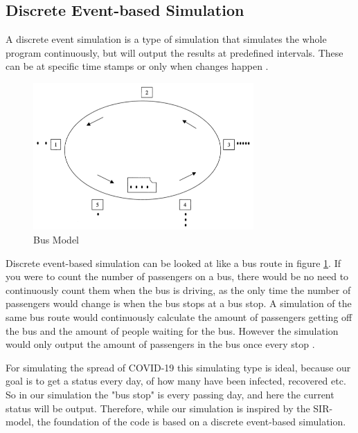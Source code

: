 \subsection{Discrete Event-based Simulation}
A discrete event simulation is a type of simulation that simulates the whole program continuously, but will output the results at predefined intervals. These can be at specific time stamps or only when changes happen \citep{howard_what_2020}.
\begin{figure}[H]
    \centering
    \includegraphics[width=0.75\textwidth]{0_billeder/BusModel.png}
    \caption{Bus Model \citep{fishman_discrete-event_2013}}
    \label{fig:Bus Model}
\end{figure}

Discrete event-based simulation can be looked at like a bus route in figure \ref{fig:Bus Model}. If you were to count the number of passengers on a bus, there would be no need to continuously count them when the bus is driving, as the only time the number of passengers would change is when the bus stops at a bus stop. A simulation of the same bus route would continuously calculate the amount of passengers getting off the bus and the amount of people waiting for the bus. However the simulation would only output the amount of passengers in the bus once every stop \citep{fishman_discrete-event_2013}. 

For simulating the spread of COVID-19 this simulating type is ideal, because our goal is to get a status every day, of how many have been infected, recovered etc. So in our simulation the "bus stop" is every passing day, and here the current status will be output. Therefore, while our simulation is inspired by the SIR-model, the foundation of the code is based on a discrete event-based simulation.

